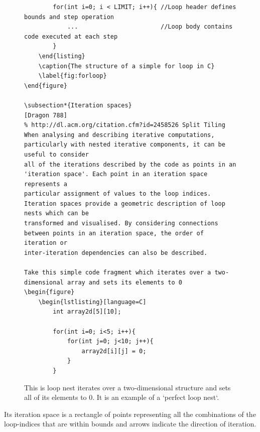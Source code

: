 \documentclass[a4paper,12pt,twoside]{report}
\begin{document}
\begin{figure}
    \begin{lstlisting}
        for(int i=0; i < LIMIT; i++){ //Loop header defines bounds and step operation
            ...                       //Loop body contains code executed at each step
        }
    \end{listing}
    \caption{The structure of a simple for loop in C}
    \label{fig:forloop}
\end{figure}

\subsection*{Iteration spaces}
[Dragon 788]
% http://dl.acm.org/citation.cfm?id=2458526 Split Tiling
When analysing and describing iterative computations, particularly with nested iterative components, it can be useful to consider 
all of the iterations described by the code as points in an 'iteration space'. Each point in an iteration space represents a
particular assignment of values to the loop indices. Iteration spaces provide a geometric description of loop nests which can be
transformed and visualised. By considering connections between points in an iteration space, the order of iteration or 
inter-iteration dependencies can also be described.

Take this simple code fragment which iterates over a two-dimensional array and sets its elements to 0
\begin{figure}
    \begin{lstlisting}[language=C]
        int array2d[5][10];

        for(int i=0; i<5; i++){
            for(int j=0; j<10; j++){
                array2d[i][j] = 0;
            }
        }
    \end{lstlisting}
        \caption{
            This is loop nest iterates over a two-dimensional structure and sets all of its elements to 0. It is an example
            of a `perfect loop nest`.
        }
        \label{fig:2dloop}
\end{figure}

Its iteration space is a rectangle of points representing all the combinations of the loop-indices that are within bounds and
arrows indicate the direction of iteration.
\end{document}
